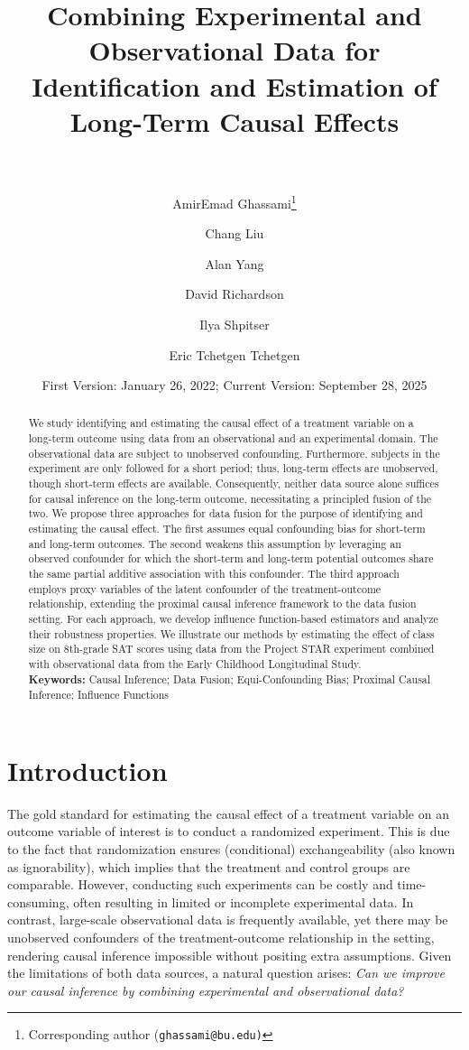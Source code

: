 \documentclass[10pt]{article}
\title{\bf \Large Combining Experimental and Observational Data for Identification and Estimation of Long-Term Causal Effects\\~\\}
\author[1]{AmirEmad Ghassami\thanks{Corresponding author (\texttt{ghassami@bu.edu)}}}
\author[1]{Chang Liu}
\author[2]{Alan Yang}
\author[3]{David Richardson}
\author[4]{Ilya Shpitser}
\author[5]{Eric Tchetgen Tchetgen}
\affil[1]{Department of Mathematics and Statistics, Boston University}
\affil[2]{Department of Electrical Engineering, Stanford University}
\affil[3]{Department of Environmental and Occupational Health, University of California, Irvine}
\affil[4]{Department of Computer Science, Johns Hopkins University}
\affil[5]{Department of Statistics and Data Science, University of Pennsylvania}
\date{\vspace{-3mm}First Version: January 26, 2022; Current Version: September 28, 2025\vspace{-3mm}}
\begin{document}
\maketitle

\begin{abstract}
We study identifying and estimating the causal effect of a treatment variable on a long-term outcome using data from an observational and an experimental domain. The observational data are subject to unobserved confounding. Furthermore, subjects in the experiment are only followed for a short period; thus, long-term effects are unobserved, though short-term effects are available. Consequently, neither data source alone suffices for causal inference on the long-term outcome, necessitating a principled fusion of the two. We propose three approaches for data fusion for the purpose of identifying and estimating the causal effect. The first assumes equal confounding bias for short-term and long-term outcomes. The second weakens this assumption by leveraging an observed confounder for which the short-term and long-term potential outcomes share the same partial additive association with this confounder. The third approach employs proxy variables of the latent confounder of the treatment-outcome relationship, extending the proximal causal inference framework to the data fusion setting. For each approach, we develop influence function-based estimators and analyze their robustness properties. We illustrate our methods by estimating the effect of class size on 8th-grade SAT scores using data from the Project STAR experiment combined with observational data from the Early Childhood Longitudinal Study.\\

\noindent \textbf{Keywords:} Causal Inference; Data Fusion; Equi-Confounding Bias; Proximal Causal Inference; Influence Functions\\
\end{abstract}	

\section{Introduction}
\label{sec:intro}


The gold standard for estimating the causal effect of a treatment variable on an outcome variable of interest is to conduct a randomized experiment. This is due to the fact that randomization ensures (conditional) exchangeability (also known as ignorability), which implies that the treatment and control groups are comparable. However, conducting such experiments can be costly and time-consuming, often resulting in limited or incomplete experimental data. In contrast, large-scale observational data is frequently available, yet there may be unobserved confounders of the treatment-outcome relationship in the setting, rendering causal inference impossible without positing extra assumptions. Given the limitations of both data sources, a natural question arises: \emph{Can we improve our causal inference by combining experimental and observational data?}
\end{document}
